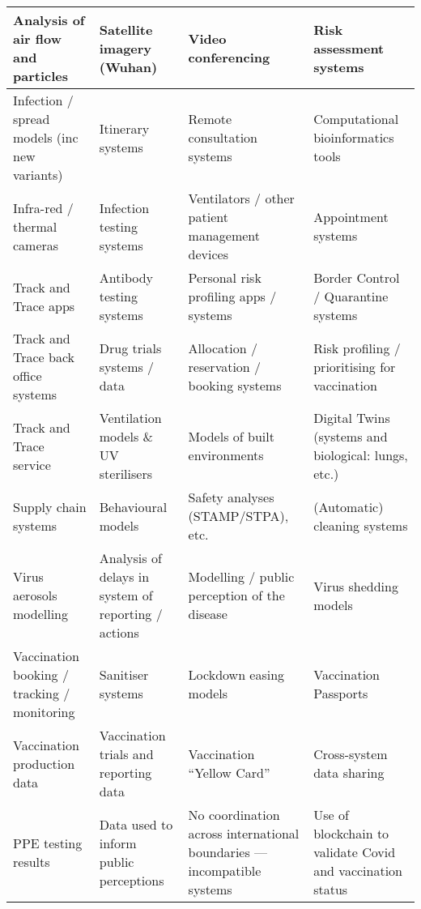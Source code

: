 \begin{longtable}{|L{}|L{}|L{}|L{}|}
  Analysis of air flow and particles & 
  Satellite imagery (Wuhan) &
  Video conferencing &
  Risk assessment systems\\\hline
  Infection / spread models (inc new variants) &
  Itinerary systems &
  Remote consultation systems &
  Computational bioinformatics tools\\\hline
  Infra-red / thermal cameras &
  Infection testing systems &
  Ventilators / other patient management devices &
  Appointment systems\\\hline
  Track and Trace apps &
  Antibody testing systems &
  Personal risk profiling apps / systems &
  Border Control / Quarantine systems\\\hline
  Track and Trace back office systems &
  Drug trials systems / data &
  Allocation / reservation / booking systems &
  Risk profiling / prioritising for vaccination\\\hline
  Track and Trace service &
  Ventilation models \& UV sterilisers &
  Models of built environments &
  Digital Twins (systems and biological: lungs, etc.)\\\hline
  Supply chain systems &
  Behavioural models &
  Safety analyses (STAMP/STPA), etc. &
  (Automatic) cleaning systems\\\hline
  Virus aerosols modelling &
  Analysis of delays in system of reporting / actions &
  Modelling / public perception of the disease &
  Virus shedding models\\\hline
%
  Vaccination booking / tracking / monitoring &
  Sanitiser systems &
  Lockdown easing models &
  Vaccination Passports
  \\\hline
%
  Vaccination production data &
  Vaccination trials and reporting data &
  Vaccination ``Yellow Card'' &
  Cross-system data sharing
  \\\hline
%
  PPE testing results &
  Data used to inform public perceptions &
  No coordination across international boundaries --- incompatible systems &
  Use of blockchain to validate Covid and vaccination status\\
  \hline
\end{longtable}

